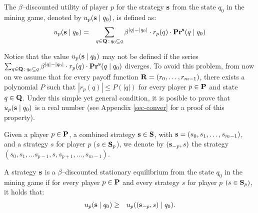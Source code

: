 \begin{mydef}
The $\beta$--discounted utility of player $p$ for the strategy $\mathbf{s}$ from the state $q_0$ in 
the mining game, denoted by $u_p(\mathbf{s} \mid q_0)$, is defined as:
\begin{eqnarray*}
u_p(\mathbf{s} \mid q_0) & = & \sum_{q \in \mathbf{Q} \,:\, q_0 \subseteq q} \beta^{|q|-|q_0|} \cdot  r_p(q) \cdot \mathbf{Pr}^{\mathbf{s}}(q \mid q_0)
\end{eqnarray*}
\end{mydef}
Notice that the value $u_p(\mathbf{s} \mid q_0)$ may not be defined if the series $\sum_{q \in \mathbf{Q} \,:\, q_0 \subseteq q} \beta^{|q|-|q_0|} \cdot  r_p(q) \cdot \mathbf{Pr}^{\mathbf{s}}(q \mid q_0)$ diverges. To avoid this problem, from now on we assume that for every payoff function $\mathbf{R} = (r_0, \ldots, r_{m-1})$, there exists a polynomial $P$ such that $|r_p(q)| \leq P(|q|)$ for every player $p \in \mathbf{P}$ and state $q \in \mathbf{Q}$. Under this simple yet general condition, it is posible to prove that $u_p(\mathbf{s} \mid q_0)$ is a real number (see Appendix \ref{sec-conver} for a proof of this property). 

Given a player $p \in \mathbf{P}$, a combined strategy $\mathbf{s} \in \mathbf{S}$, with $\mathbf{s} = (s_0,s_1, \ldots, s_{m-1})$, and a strategy $s$ for player $p$ ($s \in \mathbf{S}_p$), we denote by $(\mathbf{s}_{-p}, s)$ the strategy $(s_0, s_1, \ldots s_{p-1},s,s_{p+1}, \ldots, s_{m-1})$.
\begin{mydef}
A strategy $\mathbf{s}$ is a $\beta$--discounted stationary equilibrium from the state $q_0$ in  the %
mining game if for every player $p \in \mathbf{P}$ and every strategy $s$ for player $p$ $(s \in\mathbf{S}_p)$, it holds that:
\begin{eqnarray*}u_p(\mathbf{s} \mid q_0)  & \geq  & u_p ((\mathbf{s}_{-p},s) \mid q_0).
\end{eqnarray*}
\end{mydef}









